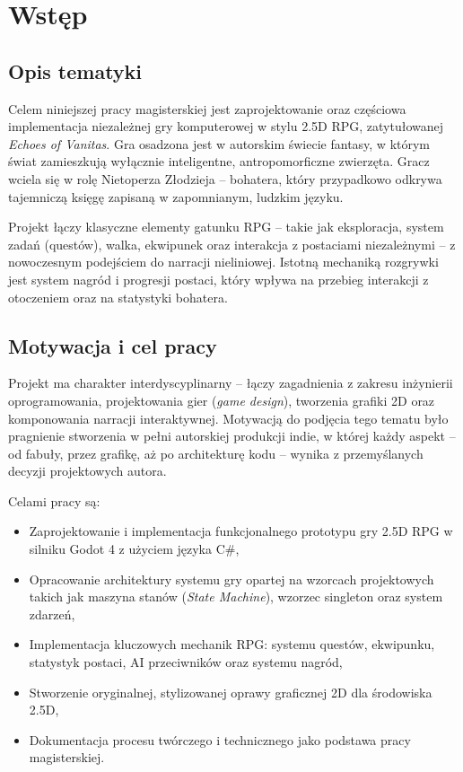 \chapter{Wstęp}

\section{Opis tematyki}

Celem niniejszej pracy magisterskiej jest zaprojektowanie oraz częściowa implementacja niezależnej gry komputerowej w stylu 2.5D RPG, zatytułowanej \textit{Echoes of Vanitas}. Gra osadzona jest w autorskim świecie fantasy, w którym świat zamieszkują wyłącznie inteligentne, antropomorficzne zwierzęta. Gracz wciela się w rolę Nietoperza Złodzieja – bohatera, który przypadkowo odkrywa tajemniczą księgę zapisaną w zapomnianym, ludzkim języku.

Projekt łączy klasyczne elementy gatunku RPG – takie jak eksploracja, system zadań (questów), walka, ekwipunek oraz interakcja z postaciami niezależnymi – z nowoczesnym podejściem do narracji nieliniowej. Istotną mechaniką rozgrywki jest system nagród i progresji postaci, który wpływa na przebieg interakcji z otoczeniem oraz na statystyki bohatera.

\section{Motywacja i cel pracy}

Projekt ma charakter interdyscyplinarny – łączy zagadnienia z zakresu inżynierii oprogramowania, projektowania gier (\textit{game design}), tworzenia grafiki 2D oraz komponowania narracji interaktywnej. Motywacją do podjęcia tego tematu było pragnienie stworzenia w pełni autorskiej produkcji indie, w której każdy aspekt – od fabuły, przez grafikę, aż po architekturę kodu – wynika z przemyślanych decyzji projektowych autora.

Celami pracy są:
\begin{itemize}
    \item Zaprojektowanie i implementacja funkcjonalnego prototypu gry 2.5D RPG w silniku Godot 4 z użyciem języka C\#,
    \item Opracowanie architektury systemu gry opartej na wzorcach projektowych takich jak maszyna stanów (\textit{State Machine}), wzorzec singleton oraz system zdarzeń,
    \item Implementacja kluczowych mechanik RPG: systemu questów, ekwipunku, statystyk postaci, AI przeciwników oraz systemu nagród,
    \item Stworzenie oryginalnej, stylizowanej oprawy graficznej 2D dla środowiska 2.5D,
    \item Dokumentacja procesu twórczego i technicznego jako podstawa pracy magisterskiej.
\end{itemize}

